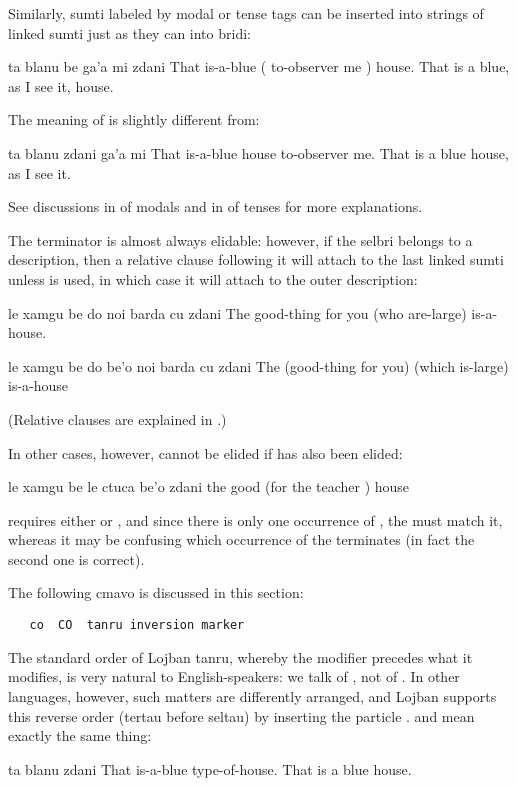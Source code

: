Similarly, sumti labeled by modal or tense tags can be inserted
    into strings of linked sumti just as they can into bridi:
\begin{example}
ta blanu be ga'a mi  zdani\n
That is-a-blue ( to-observer me ) house.\n
That is a blue, as I see it, house.
\end{example}

The meaning of  is slightly
    different from:
\begin{example}
ta blanu zdani ga'a mi\n
That is-a-blue house to-observer me.\n
That is a blue house, as I see it.
\end{example}

See discussions in  of
    modals and in  of tenses
    for more explanations.

The terminator  is almost always elidable: however,
    if the selbri belongs to a description, then a relative clause
    following it will attach to the last linked sumti unless
     is used, in which case it will attach to the outer
    description:
\begin{example}
le xamgu be do noi barda cu zdani\n
The good-thing for you (who are-large) is-a-house.
\end{example}

\begin{example}
le xamgu be do be'o noi barda cu zdani\n
The (good-thing for you) (which is-large) is-a-house
\end{example}

(Relative clauses are explained in .) 

In other cases, however,  cannot be elided if 
    has also been elided:
\begin{example}
le xamgu be le ctuca  be'o zdani\n
the good (for the teacher ) house
\end{example}

{\noindent}requires either  or , and since there is only one
    occurrence of , the  must match it, whereas it
    may be confusing which occurrence of  the 
    terminates (in fact the second one is correct).




The following cmavo is discussed in this section:
\begin{verbatim}
   co  CO  tanru inversion marker
\end{verbatim}
    The standard order of Lojban tanru, whereby the modifier
    precedes what it modifies, is very natural to English-speakers:
    we talk of , not of . In other
    languages, however, such matters are differently arranged, and
    Lojban supports this reverse order (tertau before seltau) by
    inserting the particle . 
    and  mean exactly the same
    thing:
\begin{example}
ta blanu zdani\n
That is-a-blue type-of-house.\n
That is a blue house.
\end{example}

